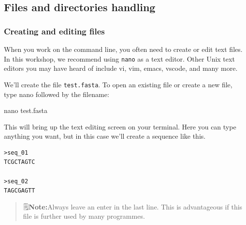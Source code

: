 \documentclass[
  letterpaper,
  DIV=11,
  numbers=noendperiod]{scrreprt}
\newenvironment{Shaded}{\begin{snugshade}}{\end{snugshade}}
\newcommand{\FunctionTok}[1]{\textcolor[rgb]{0.28,0.35,0.67}{#1}}
\newcommand{\NormalTok}[1]{\textcolor[rgb]{0.00,0.23,0.31}{#1}}
\begin{document}
\hypertarget{files-and-directories-handling}{%
\subsection*{Files and directories
handling}\label{files-and-directories-handling}}

\hypertarget{creating-and-editing-files}{%
\subsubsection*{Creating and editing
files}\label{creating-and-editing-files}}

When you work on the command line, you often need to create or edit text
files. In this workshop, we recommend using \texttt{nano} as a text
editor. Other Unix text editors you may have heard of include vi, vim,
emacs, vscode, and many more.

We'll create the file \texttt{test.fasta}. To open an existing file or
create a new file, type nano followed by the filename:

\begin{Shaded}
\begin{Highlighting}[]
\FunctionTok{nano}\NormalTok{ test.fasta}
\end{Highlighting}
\end{Shaded}

This will bring up the text editing screen on your terminal. Here you
can type anything you want, but in this case we'll create a sequence
like this.

\begin{verbatim}
>seq_01
TCGCTAGTC

>seq_02
TAGCGAGTT
\end{verbatim}

\begin{quote}
🗒️\textbf{Note:}Always leave an enter in the last line. This is
advantageous if this file is further used by many programmes.
\end{quote}
\end{document}
